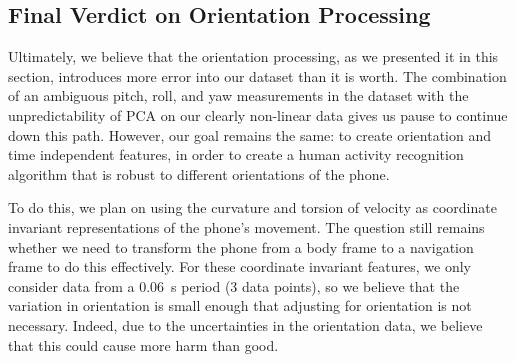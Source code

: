 \subsection{Final Verdict on Orientation Processing}

Ultimately, we believe that the orientation processing, as we presented it in this section, introduces more error into our dataset than it is worth. The combination of an ambiguous pitch, roll, and yaw measurements in the dataset with the unpredictability of PCA on our clearly non-linear data gives us pause to continue down this path. However, our goal remains the same: to create orientation and time independent features, in order to create a human activity recognition algorithm that is robust to different orientations of the phone. 

To do this, we plan on using the curvature and torsion of velocity as coordinate invariant representations of the phone's movement. The question still remains whether we need to transform the phone from a body frame to a navigation frame to do this effectively. For these coordinate invariant features, we only consider data from a \SI{0.06}{s} period (3 data points), so we believe that the variation in orientation is small enough that adjusting for orientation is not necessary. Indeed, due to the uncertainties in the orientation data, we believe that this could cause more harm than good.




